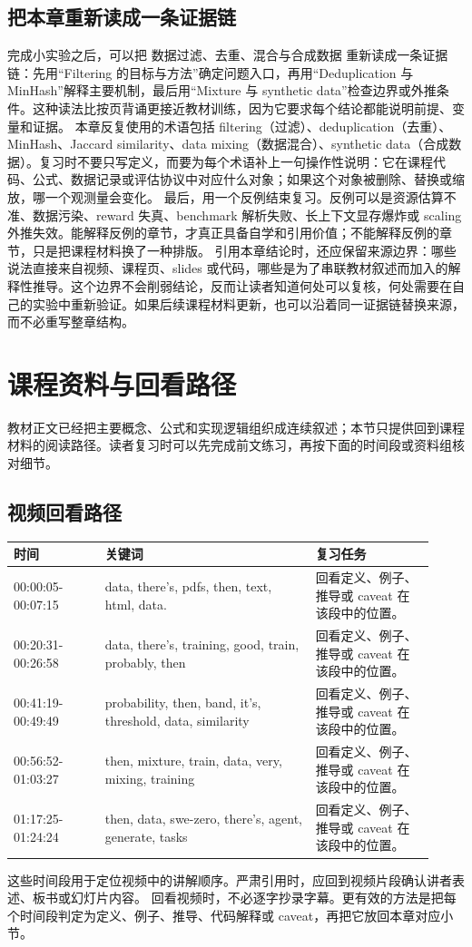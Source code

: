 \documentclass[a4paper]{article}
\begin{document}
\subsection{把本章重新读成一条证据链}
完成小实验之后，可以把 数据过滤、去重、混合与合成数据 重新读成一条证据链：先用“Filtering 的目标与方法”确定问题入口，再用“Deduplication 与 MinHash”解释主要机制，最后用“Mixture 与 synthetic data”检查边界或外推条件。这种读法比按页背诵更接近教材训练，因为它要求每个结论都能说明前提、变量和证据。
本章反复使用的术语包括 filtering（过滤）、deduplication（去重）、MinHash、Jaccard similarity、data mixing（数据混合）、synthetic data（合成数据）。复习时不要只写定义，而要为每个术语补上一句操作性说明：它在课程代码、公式、数据记录或评估协议中对应什么对象；如果这个对象被删除、替换或缩放，哪一个观测量会变化。
最后，用一个反例结束复习。反例可以是资源估算不准、数据污染、reward 失真、benchmark 解析失败、长上下文显存爆炸或 scaling 外推失效。能解释反例的章节，才真正具备自学和引用价值；不能解释反例的章节，只是把课程材料换了一种排版。
引用本章结论时，还应保留来源边界：哪些说法直接来自视频、课程页、slides 或代码，哪些是为了串联教材叙述而加入的解释性推导。这个边界不会削弱结论，反而让读者知道何处可以复核，何处需要在自己的实验中重新验证。如果后续课程材料更新，也可以沿着同一证据链替换来源，而不必重写整章结构。
\section{课程资料与回看路径}
教材正文已经把主要概念、公式和实现逻辑组织成连续叙述；本节只提供回到课程材料的阅读路径。读者复习时可以先完成前文练习，再按下面的时间段或资料组核对细节。
\subsection{视频回看路径}
\begin{longtable}{p{0.20\linewidth}p{0.46\linewidth}p{0.26\linewidth}}
\toprule
\textbf{时间} & \textbf{关键词} & \textbf{复习任务}\\
\midrule
00:00:05-00:07:15 & data, there's, pdfs, then, text, html, data. & 回看定义、例子、推导或 caveat 在该段中的位置。\\
00:20:31-00:26:58 & data, there's, training, good, train, probably, then & 回看定义、例子、推导或 caveat 在该段中的位置。\\
00:41:19-00:49:49 & probability, then, band, it's, threshold, data, similarity & 回看定义、例子、推导或 caveat 在该段中的位置。\\
00:56:52-01:03:27 & then, mixture, train, data, very, mixing, training & 回看定义、例子、推导或 caveat 在该段中的位置。\\
01:17:25-01:24:24 & then, data, swe-zero, there's, agent, generate, tasks & 回看定义、例子、推导或 caveat 在该段中的位置。\\
\bottomrule
\end{longtable}
这些时间段用于定位视频中的讲解顺序。严肃引用时，应回到视频片段确认讲者表述、板书或幻灯片内容。
回看视频时，不必逐字抄录字幕。更有效的方法是把每个时间段判定为定义、例子、推导、代码解释或 caveat，再把它放回本章对应小节。
\end{document}
